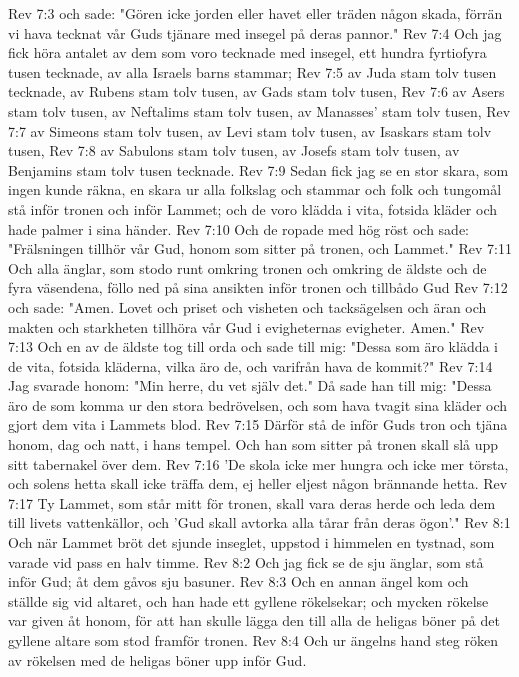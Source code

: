 Rev 7:3  och sade: "Gören icke jorden eller havet eller träden någon skada, förrän vi hava tecknat vår Guds tjänare med insegel på deras pannor."
Rev 7:4  Och jag fick höra antalet av dem som voro tecknade med insegel, ett hundra fyrtiofyra tusen tecknade, av alla Israels barns stammar;
Rev 7:5  av Juda stam tolv tusen tecknade, av Rubens stam tolv tusen, av Gads stam tolv tusen,
Rev 7:6  av Asers stam tolv tusen, av Neftalims stam tolv tusen, av Manasses' stam tolv tusen,
Rev 7:7  av Simeons stam tolv tusen, av Levi stam tolv tusen, av Isaskars stam tolv tusen,
Rev 7:8  av Sabulons stam tolv tusen, av Josefs stam tolv tusen, av Benjamins stam tolv tusen tecknade.
Rev 7:9  Sedan fick jag se en stor skara, som ingen kunde räkna, en skara ur alla folkslag och stammar och folk och tungomål stå inför tronen och inför Lammet; och de voro klädda i vita, fotsida kläder och hade palmer i sina händer.
Rev 7:10  Och de ropade med hög röst och sade: "Frälsningen tillhör vår Gud, honom som sitter på tronen, och Lammet."
Rev 7:11  Och alla änglar, som stodo runt omkring tronen och omkring de äldste och de fyra väsendena, föllo ned på sina ansikten inför tronen och tillbådo Gud
Rev 7:12  och sade: "Amen. Lovet och priset och visheten och tacksägelsen och äran och makten och starkheten tillhöra vår Gud i evigheternas evigheter. Amen."
Rev 7:13  Och en av de äldste tog till orda och sade till mig: "Dessa som äro klädda i de vita, fotsida kläderna, vilka äro de, och varifrån hava de kommit?"
Rev 7:14  Jag svarade honom: "Min herre, du vet själv det." Då sade han till mig: "Dessa äro de som komma ur den stora bedrövelsen, och som hava tvagit sina kläder och gjort dem vita i Lammets blod.
Rev 7:15  Därför stå de inför Guds tron och tjäna honom, dag och natt, i hans tempel. Och han som sitter på tronen skall slå upp sitt tabernakel över dem.
Rev 7:16  'De skola icke mer hungra och icke mer törsta, och solens hetta skall icke träffa dem, ej heller eljest någon brännande hetta.
Rev 7:17  Ty Lammet, som står mitt för tronen, skall vara deras herde och leda dem till livets vattenkällor, och 'Gud skall avtorka alla tårar från deras ögon'."
Rev 8:1  Och när Lammet bröt det sjunde inseglet, uppstod i himmelen en tystnad, som varade vid pass en halv timme.
Rev 8:2  Och jag fick se de sju änglar, som stå inför Gud; åt dem gåvos sju basuner.
Rev 8:3  Och en annan ängel kom och ställde sig vid altaret, och han hade ett gyllene rökelsekar; och mycken rökelse var given åt honom, för att han skulle lägga den till alla de heligas böner på det gyllene altare som stod framför tronen.
Rev 8:4  Och ur ängelns hand steg röken av rökelsen med de heligas böner upp inför Gud.
